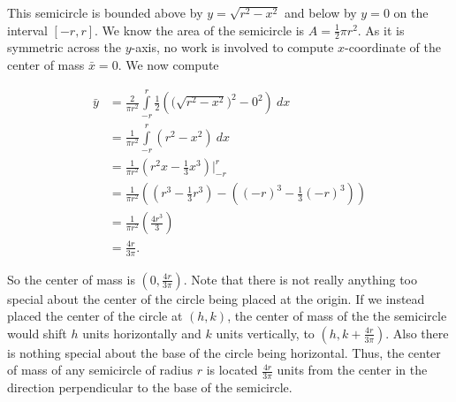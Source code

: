 {This semicircle is bounded above by $y=\sqrt{r^2-x^2}$ and below by $y=0$ on the interval $[-r,r]$.
We know the area of the semicircle is $A=\frac12 \pi r^2$.
As it is symmetric across the $y$-axis, no work is involved to compute $x$-coordinate of the center of mass $\bar{x}=0$.
We now compute

\begin{align*}
\bar{y} &= \frac{2}{\pi r^2} \int \limits_{-r}^r \frac{1}{2} \left( \Big(\sqrt{r^2-x^2}\Big)^2 - 0^2 \right) \ dx\\
&= \frac{1}{\pi r^2} \int \limits_{-r}^r \left(r^2-x^2\right)\ dx\\
&= \frac{1}{\pi r^2} \left(r^2 x - \frac{1}{3}x^3\right)\Big|_{-r}^r\\
&= \frac{1}{\pi r^2} \left( \left(r^3-\frac{1}{3}r^3\right) - \left((-r)^3-\frac{1}{3}(-r)^3\right) \right)\\
&= \frac{1}{\pi r^2} \left( \frac{4r^3}{3} \right)\\
&= \frac{4r}{3\pi}.
\end{align*}

So the center of mass is $\left(0,\frac{4r}{3\pi}\right)$.
Note that there is not really anything too special about the center of the circle being placed at the origin.  If we instead placed the center of the circle at $(h,k)$, the center of mass of the the semicircle would shift $h$ units horizontally and $k$ units vertically, to
$\left(h,k+\frac{4r}{3\pi}\right)$.
Also there is nothing special about the base of the circle being horizontal.  Thus, the center of mass of any semicircle of radius $r$ is located $\frac{4r}{3\pi}$ units from the center in the direction perpendicular to the base of the semicircle.
}\\


